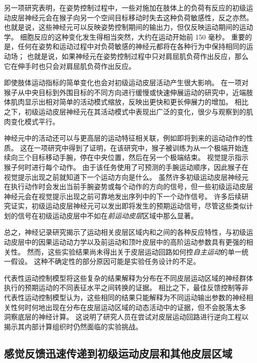 另一项研究表明，在姿势控制过程中，一些对施加在肢体上的负荷有反应的初级运动皮层神经元会在猴子向另一个空间目标移动时失去这种负荷敏感性，反之亦然。
也就是说，这些神经元可以反映姿势控制期间的输出力，但仅反映运动期间的运动学。
细胞反应的这种变化发生得相当突然，大约在运动开始前 150 毫秒。
重要的是，任何在姿势和运动过程中对负荷敏感的神经元都将在各种行为中保持相同的运动场；
也就是说，如果神经元在姿势控制过程中只对肩屈肌负荷作出反应，那么它在伸手时也只会对肩屈肌负荷作出反应。


即使肢体运动指标的简单变化也会对初级运动皮层活动产生很大影响。
在一项对猴子从中央目标到外围目标的不同方向进行缓慢或快速伸展运动的研究中，近端肢体肌肉显示出相对简单的活动模式缩放，反映出更快和更长伸展力的增加。
相比之下，初级运动皮层神经元在其活动模式中表现出广泛的变化，很少与观察到的肌肉变化模式平行。


神经元中的活动还可以与更高层的运动特征相关联，例如即将到来的运动动作的性质。 
这在一项研究中得到了证明，在该研究中，猴子被训练为从一个极端开始连续向三个目标移动手腕，停在中央位置，然后在另一个极端结束。
视觉提示指示猴子何时进行每个动作。
由于该任务使用了可预测的手腕运动顺序，因此猴子在视觉提示出现之前就知道下一个运动方向是什么。
虽然许多初级运动皮层神经元在执行动作时会发出当前手腕姿势或每个动作的方向的信号，但一些初级运动皮层神经元会在视觉提示出现之前可靠地发出序列中的下一个动作信号。
许多后续研究证实，初级运动皮层神经元可以发出即将发生的预期运动信号，尽管这些类似计划的信号在初级运动皮层中不如在\textit{前运动皮层}区域中那么显著。


总之，神经记录研究揭示了运动相关皮层区域内和之间的各种反应特性，与初级运动皮层中的因果运动动力学以及前运动和顶叶皮层中的高阶运动参数具有更强的相关性。
然而，这些实验结果尚未得出关于皮层运动回路如何控\textit{自主运动}的单一统一假设。
这种不确定性的部分原因可能是实验任务设计的不足。


代表性运动控制模型将这些复杂的结果解释为分布在不同皮层运动区域的神经群体执行的预期运动的不同表征水平之间转换的证据。
相比之下，最佳反馈控制等非代表性运动控制模型认为，这些相同的结果只能解释为不同运动输出参数的神经相关性何时何地出现在分布在皮层运动区域的动态活动中的证据，但不会脱落太多 洞察底层的神经计算。
这说明了研究人员在尝试对皮层运动回路进行逆向工程以揭示其内部计算组织时仍然面临的实验挑战。



\subsection{感觉反馈迅速传递到初级运动皮层和其他皮层区域}

